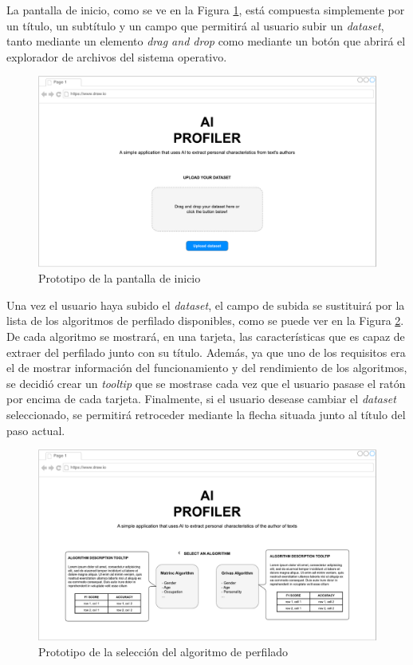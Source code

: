 \bigskip
La pantalla de inicio, como se ve en la Figura \ref{fig:prototipo_inicio}, está compuesta simplemente por un título, 
un subtítulo y un campo que permitirá al usuario subir un \textit{dataset}, tanto mediante un elemento \textit{drag and drop} como
mediante un botón que abrirá el explorador de archivos del sistema operativo.

\bigskip
\begin{figure}[H]
	\centering
	\includegraphics[width=\textwidth]{diagramas/landing.pdf}
	\caption{Prototipo de la pantalla de inicio}
	\label{fig:prototipo_inicio}
\end{figure}

\bigskip
Una vez el usuario haya subido el \textit{dataset}, el campo de subida se sustituirá por la lista de los
algoritmos de perfilado disponibles, como se puede ver en la Figura \ref{fig:prototipo_algoritmo_perfilado}. De cada algoritmo se mostrará, en una tarjeta, las características que es capaz de extraer
del perfilado junto con su título. Además, ya que uno de los requisitos era el de mostrar información del funcionamiento
y del rendimiento de los algoritmos, se decidió crear un \textit{tooltip} que se mostrase cada vez que el usuario pasase el ratón
por encima de cada tarjeta. Finalmente, si el usuario desease cambiar el \textit{dataset} seleccionado, se permitirá retroceder mediante
la flecha situada junto al título del paso actual.

\bigskip
\begin{figure}[H]
	\centering
	\includegraphics[width=\textwidth]{diagramas/landing-algorithm.pdf}
	\caption{Prototipo de la selección del algoritmo de perfilado}
	\label{fig:prototipo_algoritmo_perfilado}
\end{figure}

